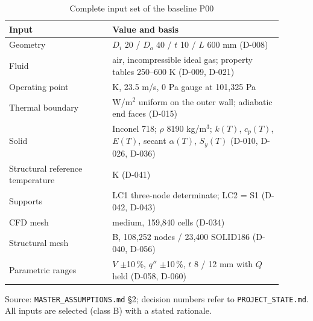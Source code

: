 \begin{table}[htbp]
\centering
\footnotesize
\caption{Complete input set of the baseline P00}
\label{tab:appA}
\begin{tabular}{>{\raggedright\arraybackslash}p{0.34\linewidth}>{\raggedright\arraybackslash}p{0.56\linewidth}}
\toprule
Input & Value and basis \\
\midrule
Geometry & $D_i$ 20 / $D_o$ 40 / $t$ 10 / $L$ 600 mm (D-008) \\
Fluid & air, incompressible ideal gas; property tables 250--600 K (D-009, D-021) \\
Operating point & 300 K, 23.5 m/s, 0 Pa gauge at 101,325 Pa \\
Thermal boundary & 8000 W/m$^2$ uniform on the outer wall; adiabatic end faces (D-015) \\
Solid & Inconel 718; $\rho$ 8190 kg/m$^3$; $k(T)$, $c_p(T)$, $E(T)$, secant $\alpha(T)$, $S_y(T)$ (D-010, D-026, D-036) \\
Structural reference temperature & 300 K (D-041) \\
Supports & LC1 three-node determinate; LC2 = S1 (D-042, D-043) \\
CFD mesh & medium, 159,840 cells (D-034) \\
Structural mesh & B, 108,252 nodes / 23,400 SOLID186 (D-040, D-056) \\
Parametric ranges & $V$ $\pm$10\,\%, $q''$ $\pm$10\,\%, $t$ 8 / 12 mm with $Q$ held (D-058, D-060) \\
\bottomrule
\end{tabular}
\par\smallskip\parbox{\linewidth}{\footnotesize\raggedright Source: \texttt{MASTER\_ASSUMPTIONS.md} \S2; decision numbers refer to \texttt{PROJECT\_STATE.md}. All inputs are selected (class B) with a stated rationale.}
\end{table}
